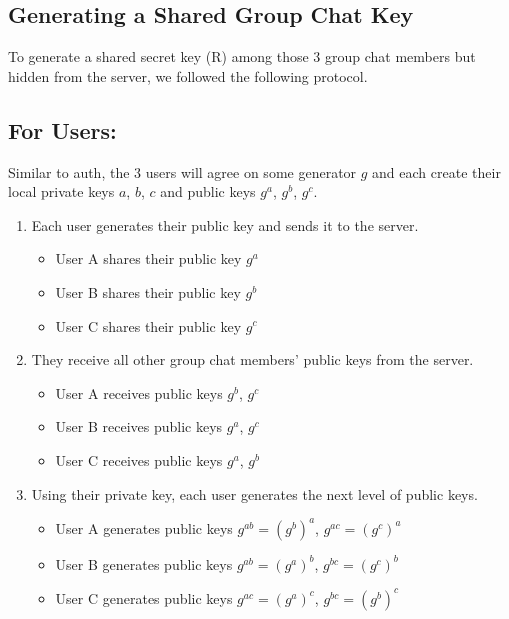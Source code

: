 \documentclass[sigconf]{acmart}
\begin{document}
\subsection{Generating a Shared Group Chat Key}

To generate a shared secret key (R) among those 3 group chat members but hidden from the server, we followed the following protocol.

\subsection*{For Users:}

Similar to auth, the 3 users will agree on some generator \(g\) and each create their local private keys \(a\), \(b\), \(c\) and public keys \(g^a\), \(g^b\), \(g^c\).

\begin{enumerate}
    \item Each user generates their public key and sends it to the server.
        \begin{itemize}
            \item User A shares their public key $g^a$
            \item User B shares their public key $g^b$
            \item User C shares their public key $g^c$
        \end{itemize}
    \item They receive all other group chat members' public keys from the server.
        \begin{itemize}
            \item User A receives public keys $g^b$, $g^c$
            \item User B receives public keys $g^a$, $g^c$
            \item User C receives public keys $g^a$, $g^b$
        \end{itemize}
    \item Using their private key, each user generates the next level of public keys.
        \begin{itemize}
            \item User A generates public keys $g^{ab} = (g^b)^a$, $g^{ac} = (g^c)^a$
            \item User B generates public keys $g^{ab} = (g^a)^b$, $g^{bc} = (g^c)^b$
            \item User C generates public keys $g^{ac} = (g^a)^c$, $g^{bc} = (g^b)^c$
        \end{itemize}
    

\end{enumerate}
\end{document}
